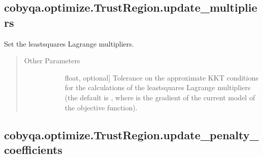 \documentclass[letterpaper,10pt,english]{sphinxmanual}
\begin{document}
\begin{fulllineitems}
\begin{fulllineitems}
\begin{quote}
\begin{description}
\begin{description}
\end{description}

\end{description}\end{quote}

\end{fulllineitems}



\subsection{cobyqa.optimize.TrustRegion.update\_multipliers}
\label{\detokenize{refs/generated/cobyqa.optimize.TrustRegion.update_multipliers:cobyqa-optimize-trustregion-update-multipliers}}\label{\detokenize{refs/generated/cobyqa.optimize.TrustRegion.update_multipliers::doc}}

\begin{fulllineitems}
\label{\detokenize{refs/generated/cobyqa.optimize.TrustRegion.update_multipliers:cobyqa.optimize.TrustRegion.update_multipliers}}
\sphinxAtStartPar
Set the least\sphinxhyphen{}squares Lagrange multipliers.
\begin{quote}\begin{description}
\item[{Other Parameters}] \leavevmode\begin{description}
\item[{}] \leavevmode{[}float, optional{]}
\sphinxAtStartPar
Tolerance on the approximate KKT conditions for the calculations of
the least\sphinxhyphen{}squares Lagrange multipliers (the default is
, where  is the
gradient of the current model of the objective function).

\end{description}

\end{description}\end{quote}

\end{fulllineitems}



\subsection{cobyqa.optimize.TrustRegion.update\_penalty\_coefficients}
\label{\detokenize{refs/generated/cobyqa.optimize.TrustRegion.update_penalty_coefficients:cobyqa-optimize-trustregion-update-penalty-coefficients}}\label{\detokenize{refs/generated/cobyqa.optimize.TrustRegion.update_penalty_coefficients::doc}}


\end{fulllineitems}
\end{document}
